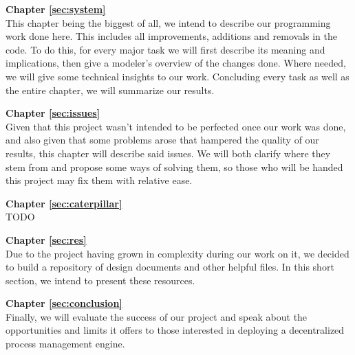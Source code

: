 \textbf{Chapter \ref{sec:system}} \\[0.2em]
This chapter being the biggest of all, we intend to describe our programming work done here. This includes all improvements, additions and removals in the code. To do this, for every major task we will first describe its meaning and implications, then give a modeler's overview of the changes done. Where needed, we will give some technical insights to our work. Concluding every task as well as the entire chapter, we will summarize our results.

\textbf{Chapter \ref{sec:issues}} \\[0.2em]
Given that this project wasn't intended to be perfected once our work was done, and also given that some problems arose that hampered the quality of our results, this chapter will describe said issues. We will both clarify where they stem from and propose some ways of solving them, so those who will be handed this project may fix them with relative ease.

\textbf{Chapter \ref{sec:caterpillar}} \\[0.2em]
TODO

\textbf{Chapter \ref{sec:res}} \\[0.2em]
Due to the project having grown in complexity during our work on it, we decided to build a repository of design documents and other helpful files. In this short section, we intend to present these resources.

\textbf{Chapter \ref{sec:conclusion}} \\[0.2em]
Finally, we will evaluate the success of our project and speak about the opportunities and limits it offers to those interested in deploying a decentralized process management engine.
